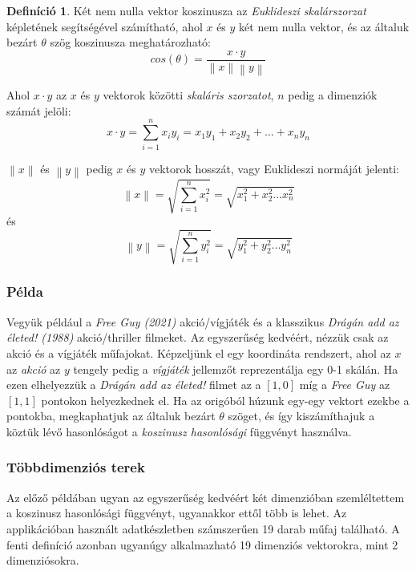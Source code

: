 \documentclass[
]{thesis-ekf}
\theoremstyle{definition}
\newtheorem{definicio}[tetel]{Definíció}
\theoremstyle{remark}
\begin{document}
\begin{definicio}
	\label{def:cosine-similarity}
	Két nem nulla vektor koszinusza az \emph{Euklideszi skalárszorzat} képletének segítségével számítható, ahol $x$ és $y$ két nem nulla vektor, és az általuk bezárt $\theta$ szög koszinusza meghatározható:
	\[ cos(\theta) =\frac{x\cdot y}{\left \|  x \right \| \left \|  y \right \|} \]\label{math-expr:cosine-similarity}
	
	Ahol $x \cdot y$ az $x$ és $y$ vektorok közötti \emph{skaláris szorzatot}, $n$ pedig a dimenziók számát jelöli:
	\[x\cdot y=\sum^{n}_{i=1}x_{i}y_{i}=x_{1}y_{1}+x_{2}y_{2}+\dots +x_{n}y_{n}\]
	
	
	$\left \|  x \right \|$ és $\left \| y \right \|$ pedig $x$ és $y$ vektorok hosszát, vagy Euklideszi normáját jelenti:
	\[\left \| x \right \|= \sqrt{\sum^{n}_{i=1}x^{2}_{i}}=\sqrt{x^{2}_{1}+x^{2}_{2} \dots x^{2}_{n}}\]
	és 
	\[\left \| y \right \|= \sqrt{\sum^{n}_{i=1}y^{2}_{i}}=\sqrt{y^{2}_{1}+y^{2}_{2} \dots y^{2}_{n}}\]
	
\cite{book:introduction-to-data-minging, wiki-skalaris-szorzat, wiki-euklideszi-norma}
\subsubsection{Példa}
Vegyük például a \emph{Free Guy (2021)} akció/vígjáték és a klasszikus \emph{Drágán add az életed! (1988)} akció/thriller filmeket. Az egyszerűség kedvéért, nézzük csak az akció és a vígjáték műfajokat. Képzeljünk el egy koordináta rendszert, ahol az $x$ az \emph{akció} az $y$ tengely pedig a \emph{vígjáték} jellemzőt reprezentálja egy 0-1 skálán. Ha ezen elhelyezzük a \emph{Drágán add az életed!}  filmet az a $[1,0]$ míg a \emph{Free Guy} az $[1,1]$ pontokon helyezkednek el. Ha az origóból húzunk egy-egy vektort ezekbe a pontokba, megkaphatjuk az általuk bezárt $\theta$ szöget, és így kiszámíthajuk a köztük lévő hasonlóságot a \emph{koszinusz hasonlósági} függvényt használva.
\end{definicio}

\subsubsection{Többdimenziós terek}
Az előző példában ugyan az egyszerűség kedvéért két dimenzióban szemléltettem a koszinusz hasonlósági függvényt, ugyanakkor ettől több is lehet. Az applikációban használt adatkészletben számszerűen 19 darab műfaj található. A fenti definíció azonban ugyanúgy alkalmazható 19 dimenziós vektorokra, mint 2 dimenziósokra.
\end{document}
